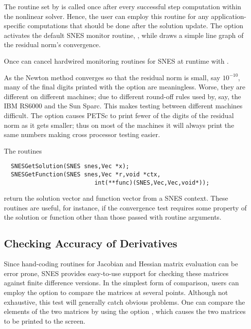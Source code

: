 The routine set by  is called once after every
successful step computation within the nonlinear solver.  Hence, the
user can employ this routine for any application-specific computations
that should be done after the solution update. The option
  activates the default
SNES monitor routine, , 
while   draws
a simple line graph of the residual norm's convergence.

Once can cancel hardwired monitoring routines for SNES at runtime with 
. 

As the Newton method converges so that the residual norm is small,
say $ 10^{-10} $, many of the final digits printed with the 
option are meaningless. Worse, they are different on different 
machines; due to different round-off rules used by, say, the IBM RS6000
and the Sun Sparc. This makes testing between different machines
difficult. The option  
causes PETSc to print fewer of the digits of the residual norm 
as it gets smaller; thus on most of the machines it will always
print the same numbers making cross processor testing easier.

The routines  
\begin{verbatim}
  SNESGetSolution(SNES snes,Vec *x);
  SNESGetFunction(SNES snes,Vec *r,void *ctx,
                          int(**func)(SNES,Vec,Vec,void*));
\end{verbatim}
return the solution vector and function vector from a SNES context. 
These routines are useful, for instance, if the convergence test requires 
some property of the solution or function other than those passed with
routine arguments.

\subsection{Checking Accuracy of Derivatives}
\label{sec:snesderivs}

Since hand-coding routines for Jacobian and Hessian matrix evaluation
can be error prone, SNES provides easy-to-use support for checking
these matrices against finite difference versions.  In the simplest
form of comparison, users can employ the option 
to compare the matrices at several points.  Although not exhaustive,
this test will generally catch obvious problems.  One can compare the
elements of the two matrices by using the option  , which causes the two 
matrices to be printed to the screen.  

